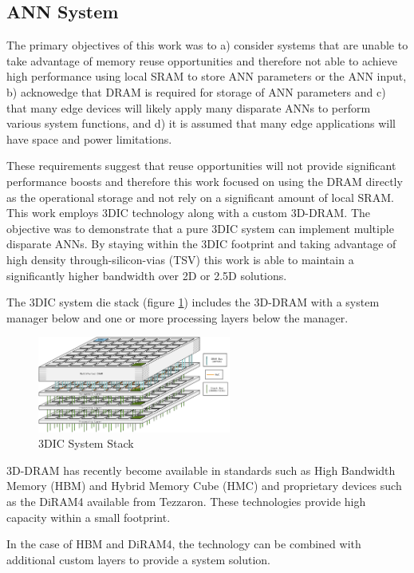 \documentclass[journal]{IEEEtran}
\begin{document}
\subsection{ANN System}
\label{sec:ANN System}

The primary objectives of this work was to a) consider systems that are unable to take advantage of memory reuse opportunities and therefore not able to achieve high performance using
local SRAM to store ANN parameters or the ANN input, b) acknowedge that DRAM is required for storage of ANN parameters and c) that many edge devices will likely apply many disparate ANNs
to perform various system functions, and d) it is assumed that many edge applications will have space and power limitations.

These requirements suggest that reuse opportunities will not provide significant performance boosts and therefore this work focused on using the DRAM directly as the operational
storage and not rely on a significant amount of local SRAM.
This work employs 3DIC technology along with a custom 3D-DRAM. The objective was to demonstrate that a pure 3DIC system can implement multiple disparate ANNs. By staying within the 3DIC footprint and taking advantage of high
density through-silicon-vias (TSV) this work is able to maintain a significantly higher bandwidth over 2D or 2.5D solutions.

The 3DIC system die stack (figure \ref{fig:3DICStack}) includes the 3D-DRAM with a system manager below and one or more processing layers below the manager.
\begin{figure}[!t]
\centerline{
\mbox{\includegraphics[width=2.5in]{StackDiagram.jpg}}
}
\caption{3DIC System Stack}
\label{fig:3DICStack}
\end{figure}

3D-DRAM has recently become available in standards such as High Bandwidth Memory (HBM) and Hybrid Memory Cube (HMC) and proprietary devices such as the DiRAM4 available from Tezzaron. 
These technologies provide high capacity within a small footprint.

In the case of HBM and DiRAM4, the technology can be combined with additional custom layers to provide a system solution.
\end{document}
